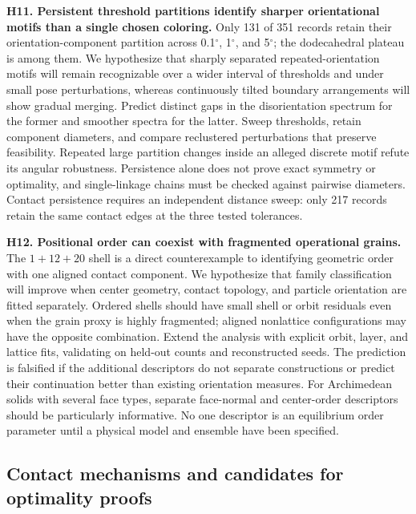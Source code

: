 \documentclass[11pt,a4paper]{article}
\begin{document}
\textbf{H11. Persistent threshold partitions identify sharper orientational motifs than a single chosen coloring.} Only 131 of 351 records retain their orientation-component partition across 0.1$^{\circ}$, 1$^{\circ}$, and 5$^{\circ}$; the dodecahedral plateau is among them. We hypothesize that sharply separated repeated-orientation motifs will remain recognizable over a wider interval of thresholds and under small pose perturbations, whereas continuously tilted boundary arrangements will show gradual merging. Predict distinct gaps in the disorientation spectrum for the former and smoother spectra for the latter. Sweep thresholds, retain component diameters, and compare reclustered perturbations that preserve feasibility. Repeated large partition changes inside an alleged discrete motif refute its angular robustness. Persistence alone does not prove exact symmetry or optimality, and single-linkage chains must be checked against pairwise diameters. Contact persistence requires an independent distance sweep: only 217 records retain the same contact edges at the three tested tolerances.

\textbf{H12. Positional order can coexist with fragmented operational grains.} The $1+12+20$ shell is a direct counterexample to identifying geometric order with one aligned contact component. We hypothesize that family classification will improve when center geometry, contact topology, and particle orientation are fitted separately. Ordered shells should have small shell or orbit residuals even when the grain proxy is highly fragmented; aligned nonlattice configurations may have the opposite combination. Extend the analysis with explicit orbit, layer, and lattice fits, validating on held-out counts and reconstructed seeds. The prediction is falsified if the additional descriptors do not separate constructions or predict their continuation better than existing orientation measures. For Archimedean solids with several face types, separate face-normal and center-order descriptors should be particularly informative. No one descriptor is an equilibrium order parameter until a physical model and ensemble have been specified.

\subsection{Contact mechanisms and candidates for optimality proofs}
\end{document}

